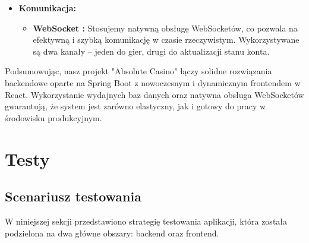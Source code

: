 \documentclass[a4paper,12pt]{article}
\begin{document}
\begin{itemize}[noitemsep]
    \item \textbf{Komunikacja:}
    \begin{itemize}[noitemsep]
        \item \textbf{WebSocket \cite{websocket}:} Stosujemy natywną obsługę WebSocketów, co pozwala na efektywną i szybką komunikację w czasie rzeczywistym. Wykorzystywane są dwa kanały – jeden do gier, drugi do aktualizacji stanu konta.
    \end{itemize}
\end{itemize}

Podsumowując, nasz projekt "Absolute Casino" łączy solidne rozwiązania backendowe oparte na Spring Boot z nowoczesnym i dynamicznym frontendem w React. Wykorzystanie wydajnych baz danych oraz natywna obsługa WebSocketów gwarantują, że system jest zarówno elastyczny, jak i gotowy do pracy w środowisku produkcyjnym.


\newpage
\section{Testy}
\subsection{Scenariusz testowania}
W niniejszej sekcji przedstawiono strategię testowania aplikacji, która została podzielona na dwa główne obszary: backend oraz frontend.
\end{document}
